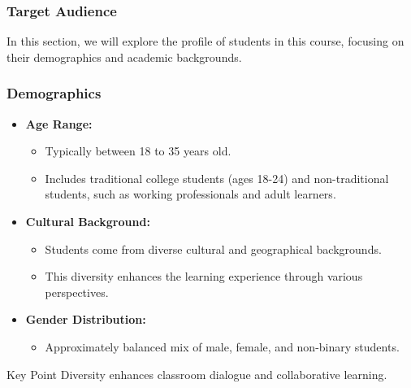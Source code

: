\documentclass[aspectratio=169]{beamer}
\begin{document}
\begin{frame}[fragile]
    \frametitle{Target Audience}
    In this section, we will explore the profile of students in this course, focusing on their demographics and academic backgrounds.
\end{frame}

\begin{frame}[fragile]
    \frametitle{Demographics}
    \begin{itemize}
        \item \textbf{Age Range:} 
            \begin{itemize}
                \item Typically between 18 to 35 years old.
                \item Includes traditional college students (ages 18-24) and non-traditional students, such as working professionals and adult learners.
            \end{itemize}
        
        \item \textbf{Cultural Background:} 
            \begin{itemize}
                \item Students come from diverse cultural and geographical backgrounds.
                \item This diversity enhances the learning experience through various perspectives.
            \end{itemize}
        
        \item \textbf{Gender Distribution:} 
            \begin{itemize}
                \item Approximately balanced mix of male, female, and non-binary students.
            \end{itemize}
    \end{itemize}
    \begin{block}{Key Point}
        Diversity enhances classroom dialogue and collaborative learning.
    \end{block}
\end{frame}
\end{document}
